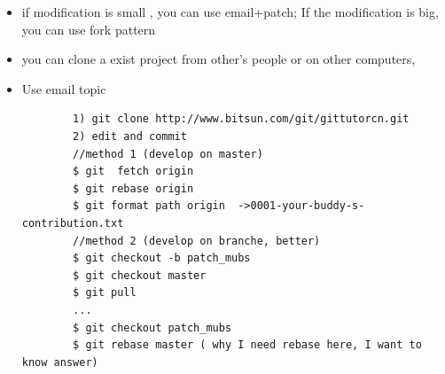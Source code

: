 \documentclass[a4paper,12pt,twoside]{book}
\begin{document}
\begin{itemize}

%
%
%
%
	\begin{itemize}
	\item if modification is small , you can use email+patch; If the modification is big, you can use fork pattern

    \item you can clone a exist project from other's people or on other computers,
	\item Use email topic
		\begin{verbatim}
		1) git clone http://www.bitsun.com/git/gittutorcn.git
		2) edit and commit
		//method 1 (develop on master)
		$ git  fetch origin
		$ git rebase origin
		$ git format path origin  ->0001-your-buddy-s-contribution.txt
		//method 2 (develop on branche, better)
		$ git checkout -b patch_mubs
		$ git checkout master
		$ git pull
		...
		$ git checkout patch_mubs
		$ git rebase master ( why I need rebase here, I want to know answer)
		

\end{verbatim}
\end{itemize}
\end{itemize}
\end{document}
